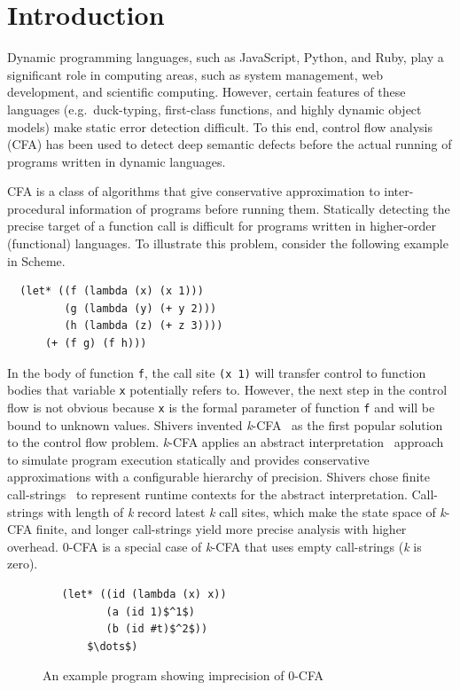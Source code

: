 \documentclass[12pt]{report}
\begin{document}
\chapter{Introduction}
\label{Introduction}
Dynamic programming languages, such as JavaScript, Python, and Ruby, play a significant role in computing areas, such as system management, web development, and scientific computing.
However, certain features of these languages (e.g.\ duck-typing, first-class functions, and highly dynamic object models) make static error detection difficult.
To this end, control flow analysis~\cite{midtgaard2012control}
 (CFA) has been used to detect deep semantic defects before the actual running of programs written in dynamic languages.

CFA is a class of algorithms that give conservative approximation to inter-procedural information of programs
before running them.
Statically detecting the precise target of a function call is difficult for programs written in
higher-order (functional) languages.
To illustrate this problem, consider the following example in Scheme.
\begin{lstlisting}
  (let* ((f (lambda (x) (x 1)))
         (g (lambda (y) (+ y 2)))
         (h (lambda (z) (+ z 3))))
      (+ (f g) (f h)))
\end{lstlisting}
In the body of function \verb|f|, the call site \verb|(x 1)| will transfer control to function bodies that variable \verb|x| potentially refers to.
However, the next step in the control flow is not obvious because \verb|x| is the formal parameter of function \verb|f| and will be bound to
unknown values.
Shivers invented \textit{k}-CFA~\cite{shivers1991control}
as the first popular solution to the control flow problem.
\textit{k}-CFA applies an abstract interpretation~\cite{cousot1977abstract} approach to simulate program execution statically and
provides conservative approximations with a configurable hierarchy of precision.
Shivers chose finite call-strings~\cite{sharir1978two} to represent runtime contexts for the abstract interpretation.
Call-strings with length of \textit{k} record latest \textit{k} call sites, which make the state space of \textit{k}-CFA finite, and longer call-strings yield more precise analysis with higher overhead.
0-CFA is a special case of \textit{k}-CFA that uses empty call-strings (\textit{k} is zero).
 \begin{figure}
 \begin{lstlisting}
   (let* ((id (lambda (x) x))
          (a (id 1)$^1$)
          (b (id #t)$^2$))
       $\dots$)
 \end{lstlisting}
 \caption{An example program showing imprecision of 0-CFA}
 \label{fig:eg1}
 \end{figure}
\end{document}
